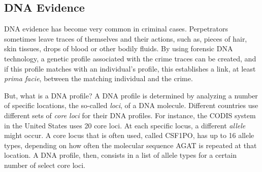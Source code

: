 \documentclass[10pt]{article}
\begin{document}

\subsection{DNA Evidence}

DNA evidence has become very common 
in criminal cases. Perpetrators sometimes leave traces of 
themselves and their actions, such as, pieces 
of hair, skin tissues, drops of blood or other bodily fluids. 
By using forensic DNA technology, a genetic profile associated with the crime traces can be created, 
and if this profile matches with an individual's profile, this establishes a link, at least \textit{prima facie}, 
between the matching individual and the crime.



But, what is a DNA profile? A DNA profile is determined by analyzing a number of specific locations, the so-called \textit{loci}, of a DNA molecule. %
Different countries use different sets of %
\textit{core loci} for their DNA profiles. 
For instance, the CODIS system in the United States uses %
20 core loci. 
At each specific locus, a different \textit{allele} might occur. 
A core locus that is often used, called %
CSF1PO, %
has up to 16 allele types, depending on how often the molecular sequence AGAT is repeated at that location. 
A DNA profile, then, consists in a list of allele types for a certain number of select core loci. 
\end{document}
